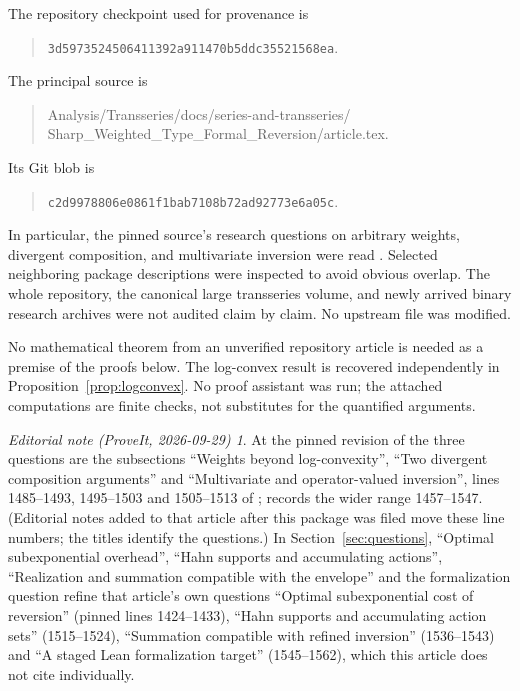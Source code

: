 \documentclass[11pt,a4paper]{article}
\numberwithin{equation}{section}
\theoremstyle{definition}
\theoremstyle{remark}
\newtheorem*{ednote}{Editorial note (ProveIt, 2026-09-29)}
\newcommand{\snapshot}{\nolinkurl{3d5973524506411392a911470b5ddc35521568ea}}
\begin{document}
The repository checkpoint used for provenance is
\begin{quote}\small\snapshot.\end{quote}
The principal source is
\begin{quote}\small\ttfamily
Analysis/Transseries/docs/series-and-transseries/\\
Sharp\_Weighted\_Type\_Formal\_Reversion/article.tex.
\end{quote}
Its Git blob is
\begin{quote}\small\nolinkurl{c2d9978806e0861f1bab7108b72ad92773e6a05c}.\end{quote}
In particular, the pinned source's research questions on arbitrary
weights, divergent composition, and multivariate inversion were read
\cite{repo-weight}. Selected neighboring package descriptions were
inspected to avoid obvious overlap. The whole repository, the canonical
large transseries volume, and newly arrived binary research archives were
not audited claim by claim. No upstream file was modified.

No mathematical theorem from an unverified repository article is needed
as a premise of the proofs below. The log-convex result is recovered
independently in Proposition~\ref{prop:logconvex}. No proof assistant was
run; the attached computations are finite checks, not substitutes for
the quantified arguments.
\begin{ednote}
At the pinned revision of \cite{repo-weight} the three questions are the
subsections ``Weights beyond log-convexity'', ``Two divergent composition
arguments'' and ``Multivariate and operator-valued inversion'', lines
1485--1493, 1495--1503 and 1505--1513 of
;
 records the wider range 1457--1547. (Editorial
notes added to that article after this package was filed move these line
numbers; the titles identify the questions.) In Section~\ref{sec:questions},
``Optimal subexponential overhead'', ``Hahn supports and accumulating
actions'', ``Realization and summation compatible with the envelope'' and
the formalization question refine that article's own questions ``Optimal
subexponential cost of reversion'' (pinned lines 1424--1433), ``Hahn supports
and accumulating action sets'' (1515--1524), ``Summation compatible with
refined inversion'' (1536--1543) and ``A staged Lean formalization target''
(1545--1562), which this article does not cite individually.
\end{ednote}
\end{document}
